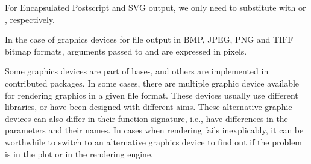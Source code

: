 \documentclass[krantz2]{krantz}\usepackage{knitr}
\begin{document}
For Encapsulated Postscript and SVG output, we only need to substitute  with  or , respectively.

\begin{knitrout}\footnotesize
{}\color{fgcolor}\begin{kframe}
\begin{alltt}
\hlstd{(} \hlstd{=} \hlstd{,}  \hlstd{=} \hlstd{,}  \hlstd{=} \hlstd{)}
\hlstd{()}
\end{alltt}
\end{kframe}
\end{knitrout}

In the case of graphics devices for file output in BMP, JPEG, PNG and TIFF bitmap formats, arguments passed to  and  are expressed in pixels.

\begin{knitrout}\footnotesize
{}\color{fgcolor}\begin{kframe}
\begin{alltt}
\hlstd{(} \hlstd{=} \hlstd{,}  \hlstd{=} \hlstd{,}  \hlstd{=} \hlstd{)}
\hlstd{()}
\end{alltt}
\end{kframe}
\end{knitrout}

\begin{warningbox}
Some graphics devices are part of base-\Rlang, and others are implemented in contributed packages. In some cases, there are multiple graphic device available for rendering graphics in a given file format. These devices usually use different libraries, or have been designed with different aims. These alternative graphic devices can also differ in their function signature, i.e., have differences in the parameters and their names. In cases when rendering fails inexplicably, it can be worthwhile to switch to an alternative graphics device to find out if the problem is in the plot or in the rendering engine.
\end{warningbox}
\end{document}
